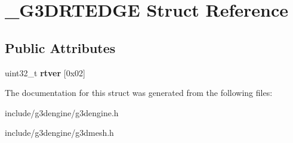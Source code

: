 \hypertarget{struct__G3DRTEDGE}{}\section{\+\_\+\+G3\+D\+R\+T\+E\+D\+GE Struct Reference}
\label{struct__G3DRTEDGE}
\subsection*{Public Attributes}
\begin{DoxyCompactItemize}
\item 
\mbox{\label{struct__G3DRTEDGE_aaca3fd8faa6881ed8984dbd90d8822d1}} 
uint32\+\_\+t {\bfseries rtver} \mbox{[}0x02\mbox{]}
\end{DoxyCompactItemize}


The documentation for this struct was generated from the following files\+:\begin{DoxyCompactItemize}
\item 
include/g3dengine/g3dengine.\+h\item 
include/g3dengine/g3dmesh.\+h\end{DoxyCompactItemize}
